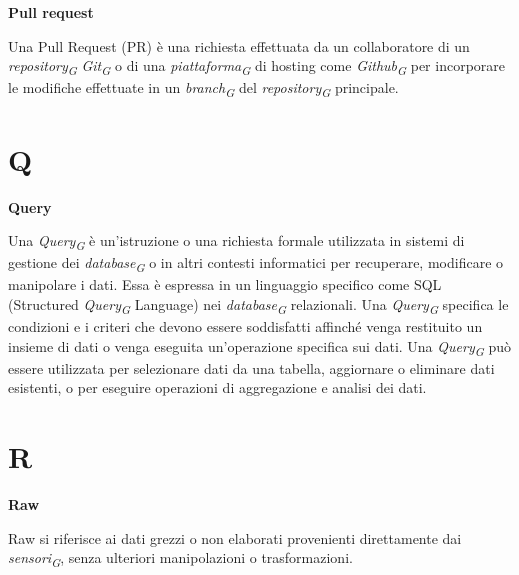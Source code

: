 \documentclass{article}
\begin{document}
\textbf{Pull request}

\vspace{0.1cm}

Una Pull Request (PR) è una richiesta effettuata da un collaboratore di un \textit{repository}\textsubscript{\textit{G}} \textit{Git}\textsubscript{\textit{G}} o di una \textit{piattaforma}\textsubscript{\textit{G}} di hosting come \textit{Github}\textsubscript{\textit{G}} per incorporare le modifiche effettuate in un \textit{branch}\textsubscript{\textit{G}} del \textit{repository}\textsubscript{\textit{G}} principale.

\pagebreak
\section*{Q}
{}

\vspace{0.4cm}

\textbf{Query}

\vspace{0.1cm}

Una \textit{Query}\textsubscript{\textit{G}} è un'istruzione o una richiesta formale utilizzata in sistemi di gestione dei \textit{database}\textsubscript{\textit{G}} o in altri contesti informatici per recuperare, modificare o manipolare i dati. Essa è espressa in un linguaggio specifico come SQL (Structured \textit{Query}\textsubscript{\textit{G}} Language) nei \textit{database}\textsubscript{\textit{G}} relazionali. Una \textit{Query}\textsubscript{\textit{G}} specifica le condizioni e i criteri che devono essere soddisfatti affinché venga restituito un insieme di dati o venga eseguita un'operazione specifica sui dati. Una \textit{Query}\textsubscript{\textit{G}} può essere utilizzata per selezionare dati da una tabella, aggiornare o eliminare dati esistenti, o per eseguire operazioni di aggregazione e analisi dei dati.

\pagebreak
\section*{R}
{}

\vspace{0.4cm}

\textbf{Raw}

\vspace{0.1cm}

Raw si riferisce ai dati grezzi o non elaborati provenienti direttamente dai \textit{sensori}\textsubscript{\textit{G}}, senza ulteriori manipolazioni o trasformazioni.
\end{document}
